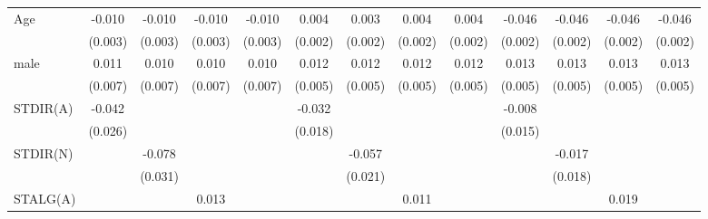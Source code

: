 {\begin{tabular*}{\linewidth}{l@{\extracolsep{\fill}}*{12}{c}}
\addlinespace
Age             &   -0.010\sym{***}&   -0.010\sym{***}&   -0.010\sym{***}&   -0.010\sym{***}&    0.004\sym{*}  &    0.003         &    0.004\sym{*}  &    0.004\sym{*}  &   -0.046\sym{***}&   -0.046\sym{***}&   -0.046\sym{***}&   -0.046\sym{***}\\
                &  (0.003)         &  (0.003)         &  (0.003)         &  (0.003)         &  (0.002)         &  (0.002)         &  (0.002)         &  (0.002)         &  (0.002)         &  (0.002)         &  (0.002)         &  (0.002)         \\
\addlinespace
male            &    0.011         &    0.010         &    0.010         &    0.010         &    0.012\sym{**} &    0.012\sym{**} &    0.012\sym{**} &    0.012\sym{**} &    0.013\sym{**} &    0.013\sym{**} &    0.013\sym{**} &    0.013\sym{**} \\
                &  (0.007)         &  (0.007)         &  (0.007)         &  (0.007)         &  (0.005)         &  (0.005)         &  (0.005)         &  (0.005)         &  (0.005)         &  (0.005)         &  (0.005)         &  (0.005)         \\
\addlinespace
STDIR(A)        &   -0.042         &                  &                  &                  &   -0.032\sym{*}  &                  &                  &                  &   -0.008         &                  &                  &                  \\
                &  (0.026)         &                  &                  &                  &  (0.018)         &                  &                  &                  &  (0.015)         &                  &                  &                  \\
\addlinespace
STDIR(N)        &                  &   -0.078\sym{**} &                  &                  &                  &   -0.057\sym{***}&                  &                  &                  &   -0.017         &                  &                  \\
                &                  &  (0.031)         &                  &                  &                  &  (0.021)         &                  &                  &                  &  (0.018)         &                  &                  \\
\addlinespace
STALG(A)        &                  &                  &    0.013\sym{**} &                  &                  &                  &    0.011\sym{*}  &                  &                  &                  &    0.019\sym{***}&                  \\

\end{tabular*}}
